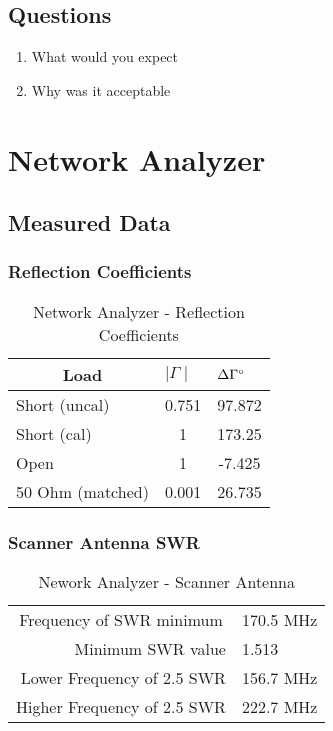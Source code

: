 \documentclass{article}
\begin{document}
\subsection{Questions}
\begin{enumerate}
	\item What would you expect
	\item Why was it acceptable
\end{enumerate}

\section{Network Analyzer}
\subsection{Measured Data}
\subsubsection{Reflection Coefficients}
\begin{table}[h]
\centering
	\begin{tabular}{|l|c|c|}
	\hline
	\multicolumn{1}{|c|}{\textbf{Load}} & \multicolumn{1}{l|}{\textbf{$\mid\Gamma\mid$}} & \multicolumn{1}{l|}{\textbf{$\Delta\Gamma\degree$}} \\ \hline
	Short (uncal)                       & 0.751                               & 97.872                              	\\ \hline
	Short (cal)                         & 1                                   & 173.25                              	\\ \hline
	Open                                & 1                                   & -7.425                              	\\ \hline
	50 Ohm (matched)                    & 0.001                               & 26.735                              	\\ \hline
	\end{tabular}
	\caption{Network Analyzer - Reflection Coefficients}
	\label{}
\end{table}

\subsubsection{Scanner Antenna SWR}
\begin{table}[h]
	\begin{tabular}{rl}
	\multicolumn{1}{c}{Frequency of SWR minimum} & 170.5 MHz \\
	Minimum SWR value                            & 1.513     \\
	Lower Frequency of 2.5 SWR                   & 156.7 MHz \\
	Higher Frequency of 2.5 SWR                  & 222.7 MHz            
	\end{tabular}
	\caption{Nework Analyzer - Scanner Antenna}
	\label{}
\end{table}
\end{document}
